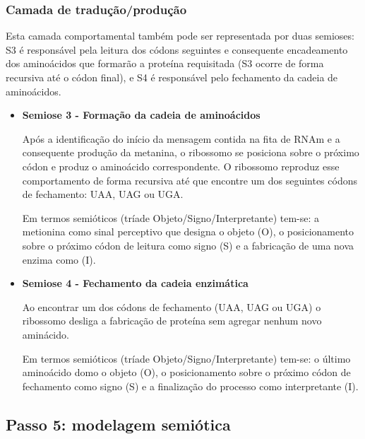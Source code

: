 \subsubsection*{Camada de tradução/produção}

Esta camada comportamental também pode ser representada por duas semioses: S3 é responsável pela leitura dos códons seguintes e consequente encadeamento dos aminoácidos que formarão a proteína requisitada (S3 ocorre de forma recursiva até o códon final), e S4 é responsável pelo fechamento da cadeia de aminoácidos.

\begin{itemize}
	\item \textbf{Semiose 3 - Formação da cadeia de aminoácidos}

	Após a identificação do início da mensagem contida na fita de RNAm e a consequente produção da metanina, o ribossomo se posiciona sobre o próximo códon e produz o aminoácido correspondente. O ribossomo reproduz esse comportamento de forma recursiva até que encontre um dos seguintes códons de fechamento: UAA, UAG ou UGA.

	Em termos semióticos (tríade Objeto/Signo/Interpretante) tem-se: a metionina como sinal perceptivo que designa o objeto (O), o posicionamento sobre o próximo códon de leitura como signo (S) e a fabricação de uma nova enzima como (I).


	\item \textbf{Semiose 4 - Fechamento da cadeia enzimática}

	Ao encontrar um dos códons de fechamento (UAA, UAG ou UGA) o ribossomo desliga a fabricação de proteína sem agregar nenhum novo aminácido.

	Em termos semióticos (tríade Objeto/Signo/Interpretante) tem-se: o último aminoácido domo o objeto (O), o posicionamento sobre o próximo códon de fechamento como signo (S) e a finalização do processo como interpretante (I).


\end{itemize}

\subsection{Passo 5: modelagem semiótica}


